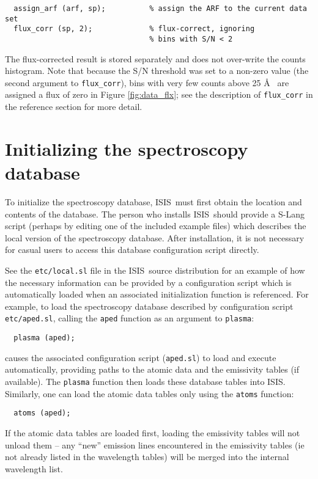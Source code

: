 \documentclass{book}
\newcommand{\isisx}{{\sc ISIS~}}
\newcommand{\isis}{{\sc ISIS}}
\begin{document}
{\begin{verbatim}
  assign_arf (arf, sp);          % assign the ARF to the current data set
  flux_corr (sp, 2);             % flux-correct, ignoring
                                 % bins with S/N < 2
\end{verbatim}
The flux-corrected result is stored separately and does not over-write
the counts histogram. Note that because the S/N threshold was set to a
non-zero value (the second argument to {\tt flux\_corr}), bins with
very few counts above 25 \AA~ are assigned a flux of zero in Figure
\ref{fig:data_flx};  see the
description of {\tt flux\_corr} in the reference section for more detail.

\section{Initializing the spectroscopy database}
\label{specdb-init}

To initialize the spectroscopy database, \isisx must first obtain
the location and contents of the database.  The person who
installs \isisx should provide a S-Lang script (perhaps by editing
one of the included example files) which describes the local
version of the spectroscopy database.  After installation, it is
not necessary for casual users to access this database
configuration script directly.

See the {\tt etc/local.sl} file in the \isisx source distribution for
an example of how the necessary information can be provided by a
configuration script which is automatically loaded when an
associated initialization function is referenced.  For example, to
load the spectroscopy database described by configuration script
{\tt etc/aped.sl}, calling the {\tt aped} function as an argument to
{\tt plasma}:
 \begin{verbatim}
  plasma (aped);
 \end{verbatim}
causes the associated configuration script ({\tt aped.sl}) to load
and execute automatically, providing paths to
the atomic data and the emissivity tables (if available).
The {\tt plasma} function then loads these database tables into
\isis.
Similarly, one can load the atomic data tables only using the
{\tt atoms} function:
\begin{verbatim}
  atoms (aped);
 \end{verbatim}
If the atomic data tables are loaded first, loading the emissivity
tables will not unload them -- any ``new'' emission lines
encountered in the emissivity tables (ie not already listed in the
wavelength tables) will be merged into the internal wavelength
list.

}
\end{document}
